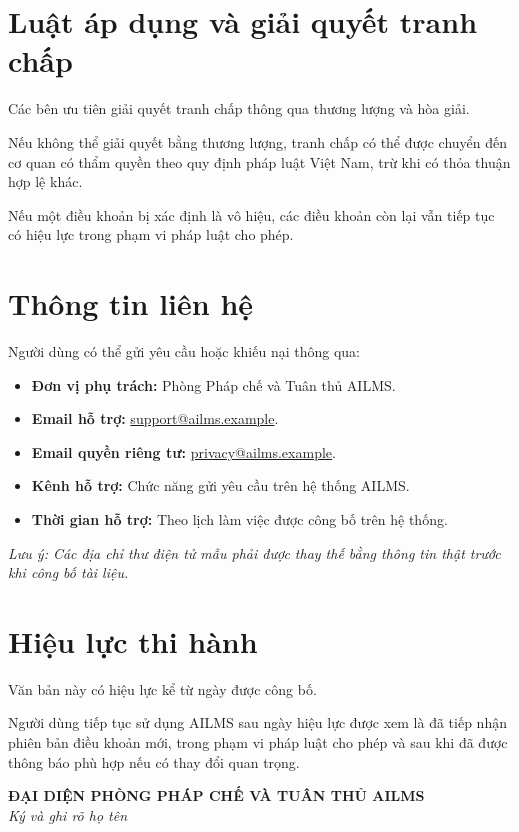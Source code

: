 \documentclass[12pt,a4paper]{article}
\begin{document}
\section{Luật áp dụng và giải quyết tranh chấp}

Các bên ưu tiên giải quyết tranh chấp thông qua thương lượng và hòa giải.

Nếu không thể giải quyết bằng thương lượng, tranh chấp có thể được chuyển đến
cơ quan có thẩm quyền theo quy định pháp luật Việt Nam,
trừ khi có thỏa thuận hợp lệ khác.

Nếu một điều khoản bị xác định là vô hiệu, các điều khoản còn lại vẫn tiếp tục có hiệu lực
trong phạm vi pháp luật cho phép.

\section{Thông tin liên hệ}

Người dùng có thể gửi yêu cầu hoặc khiếu nại thông qua:

\begin{itemize}
    \item \textbf{Đơn vị phụ trách:} Phòng Pháp chế và Tuân thủ AILMS.
    \item \textbf{Email hỗ trợ:}
    \href{mailto:support@ailms.example}{support@ailms.example}.
    \item \textbf{Email quyền riêng tư:}
    \href{mailto:privacy@ailms.example}{privacy@ailms.example}.
    \item \textbf{Kênh hỗ trợ:} Chức năng gửi yêu cầu trên hệ thống AILMS.
    \item \textbf{Thời gian hỗ trợ:} Theo lịch làm việc được công bố trên hệ thống.
\end{itemize}

\textcolor{ailmsred}{
\textit{Lưu ý: Các địa chỉ thư điện tử mẫu phải được thay thế bằng thông tin thật
trước khi công bố tài liệu.}
}

\section{Hiệu lực thi hành}

Văn bản này có hiệu lực kể từ ngày được công bố.

Người dùng tiếp tục sử dụng AILMS sau ngày hiệu lực được xem là đã tiếp nhận
phiên bản điều khoản mới, trong phạm vi pháp luật cho phép và sau khi đã được
thông báo phù hợp nếu có thay đổi quan trọng.

\vfill

\begin{center}
    \textbf{ĐẠI DIỆN PHÒNG PHÁP CHẾ VÀ TUÂN THỦ AILMS}\\[1.5cm]
    \textit{Ký và ghi rõ họ tên}
\end{center}
\end{document}
